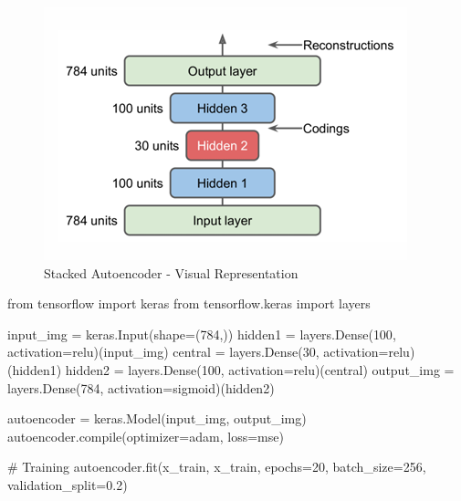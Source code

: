 \documentclass[
  letterpaper,
  DIV=11,
  numbers=noendperiod]{scrreprt}
\newenvironment{Shaded}{\begin{snugshade}}{\end{snugshade}}
\newcommand{\BuiltInTok}[1]{\textcolor[rgb]{0.00,0.23,0.31}{#1}}
\newcommand{\CommentTok}[1]{\textcolor[rgb]{0.37,0.37,0.37}{#1}}
\newcommand{\DecValTok}[1]{\textcolor[rgb]{0.68,0.00,0.00}{#1}}
\newcommand{\FloatTok}[1]{\textcolor[rgb]{0.68,0.00,0.00}{#1}}
\newcommand{\ImportTok}[1]{\textcolor[rgb]{0.00,0.46,0.62}{#1}}
\newcommand{\NormalTok}[1]{\textcolor[rgb]{0.00,0.23,0.31}{#1}}
\newcommand{\OperatorTok}[1]{\textcolor[rgb]{0.37,0.37,0.37}{#1}}
\newcommand{\StringTok}[1]{\textcolor[rgb]{0.13,0.47,0.30}{#1}}
\begin{document}
\begin{figure}[H]

{\centering \includegraphics[width=0.8\linewidth,height=\textheight,keepaspectratio]{chapter12_stacked_autoencoder.png}

}

\caption{Stacked Autoencoder - Visual Representation}

\end{figure}%

\begin{Shaded}
\begin{Highlighting}[]
\ImportTok{from}\NormalTok{ tensorflow }\ImportTok{import}\NormalTok{ keras}
\ImportTok{from}\NormalTok{ tensorflow.keras }\ImportTok{import}\NormalTok{ layers}

\NormalTok{input\_img }\OperatorTok{=}\NormalTok{ keras.Input(shape}\OperatorTok{=}\NormalTok{(}\DecValTok{784}\NormalTok{,))}
\NormalTok{hidden1 }\OperatorTok{=}\NormalTok{ layers.Dense(}\DecValTok{100}\NormalTok{, activation}\OperatorTok{=}\StringTok{\textquotesingle{}relu\textquotesingle{}}\NormalTok{)(input\_img)}
\NormalTok{central }\OperatorTok{=}\NormalTok{ layers.Dense(}\DecValTok{30}\NormalTok{, activation}\OperatorTok{=}\StringTok{\textquotesingle{}relu\textquotesingle{}}\NormalTok{)(hidden1)}
\NormalTok{hidden2 }\OperatorTok{=}\NormalTok{ layers.Dense(}\DecValTok{100}\NormalTok{, activation}\OperatorTok{=}\StringTok{\textquotesingle{}relu\textquotesingle{}}\NormalTok{)(central)}
\NormalTok{output\_img }\OperatorTok{=}\NormalTok{ layers.Dense(}\DecValTok{784}\NormalTok{, activation}\OperatorTok{=}\StringTok{\textquotesingle{}sigmoid\textquotesingle{}}\NormalTok{)(hidden2)}

\NormalTok{autoencoder }\OperatorTok{=}\NormalTok{ keras.Model(input\_img, output\_img)}
\NormalTok{autoencoder.}\BuiltInTok{compile}\NormalTok{(optimizer}\OperatorTok{=}\StringTok{\textquotesingle{}adam\textquotesingle{}}\NormalTok{, loss}\OperatorTok{=}\StringTok{\textquotesingle{}mse\textquotesingle{}}\NormalTok{)}

\CommentTok{\# Training}
\NormalTok{autoencoder.fit(x\_train, x\_train, epochs}\OperatorTok{=}\DecValTok{20}\NormalTok{, batch\_size}\OperatorTok{=}\DecValTok{256}\NormalTok{, validation\_split}\OperatorTok{=}\FloatTok{0.2}\NormalTok{)}
\end{Highlighting}
\end{Shaded}
\end{document}
